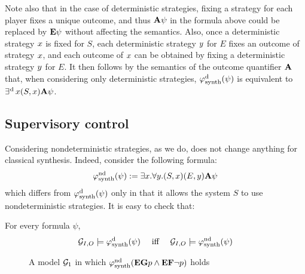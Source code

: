 Note also that in the case of deterministic strategies, fixing a
strategy for each player fixes a unique outcome, and thus ${\bf A}\psi$ in
the formula above could be replaced by ${\bf E}\psi$ without affecting the semantics.
Also, once a deterministic strategy $x$ is fixed for $S$, each
deterministic strategy $y$ for $E$ fixes an outcome of strategy $x$, and each outcome
of $x$ can be obtained by fixing a deterministic strategy $y$
for $E$. It then follows by the
semantics of the outcome quantifier ${\bf A}$ that, when
considering only deterministic strategies,
$\varphi^{\text{d}}_{\text{synth}}(\psi)$ is equivalent to $\operatorname*{\exists^{\hskip.5pt\text{d}}} x (S,x){\bf A}\psi$.

\subsection{Supervisory control}
\label{sec-nd-synth}

Considering nondeterministic strategies, as we do, does not change
anything for classical \LTL synthesis. Indeed, consider the following
formula:
\[\varphi^{\text{nd}}_{\text{synth}}(\psi):=\exists x.   \forall y.
 (S,x)(E,y) {\bf A} \psi\]
which differs from $\varphi^{\text{d}}_{\text{synth}}(\psi)$ only in that it allows the system
$S$ to use nondeterministic strategies. It is easy to check that:
\begin{proposition}
  \label{prop-equiv-synth}
  For every \LTL formula $\psi$, \[\CGS_{I,O}\models
  \phisynthdet(\psi) \quad\mbox{ iff } \quad\CGS_{I,O}\models \phisynthndet(\psi)\]
\end{proposition}

\begin{figure}
  \centering
{}  
  \caption{A model $\CGS_1$ in which $\varphi^{\text{nd}}_{\text{synth}}({\bf E} {\bf G} p
  \wedge {\bf E} {\bf F} \neg p)$ holds}
  \label{fig:example}
\end{figure}

